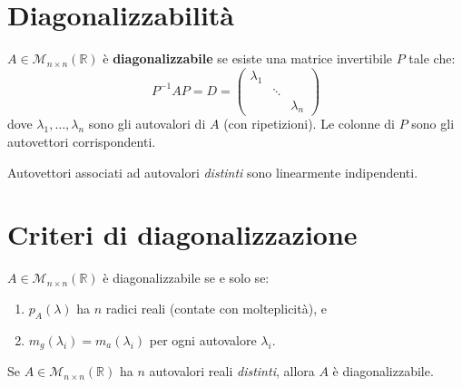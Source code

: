 \section{Diagonalizzabilità}
\label{sec:diagonalizzabilita}

\begin{definitionbox}
$A \in \mathcal{M}_{n \times n}(\mathbb{R})$ è \textbf{diagonalizzabile} se esiste una matrice invertibile $P$ tale che:
\[ P^{-1}AP = D = \begin{pmatrix} \lambda_1 & & \\ & \ddots & \\ & & \lambda_n \end{pmatrix} \]
dove $\lambda_1, \ldots, \lambda_n$ sono gli autovalori di $A$ (con ripetizioni). Le colonne di $P$ sono gli autovettori corrispondenti.
\end{definitionbox}

\begin{theorembox}
\label{thm:autovettori-indipendenti}
Autovettori associati ad autovalori \emph{distinti} sono linearmente indipendenti.
\end{theorembox}

\section{Criteri di diagonalizzazione}
\label{sec:criteri-diag}

\begin{theorembox}
\label{thm:diag-cns}
$A \in \mathcal{M}_{n \times n}(\mathbb{R})$ è diagonalizzabile se e solo se:
\begin{enumerate}
    \item $p_A(\lambda)$ ha $n$ radici reali (contate con molteplicità), e
    \item $m_g(\lambda_i) = m_a(\lambda_i)$ per ogni autovalore $\lambda_i$.
\end{enumerate}
\end{theorembox}

\begin{theorembox}
Se $A \in \mathcal{M}_{n \times n}(\mathbb{R})$ ha $n$ autovalori reali \emph{distinti}, allora $A$ è diagonalizzabile.
\end{theorembox}


